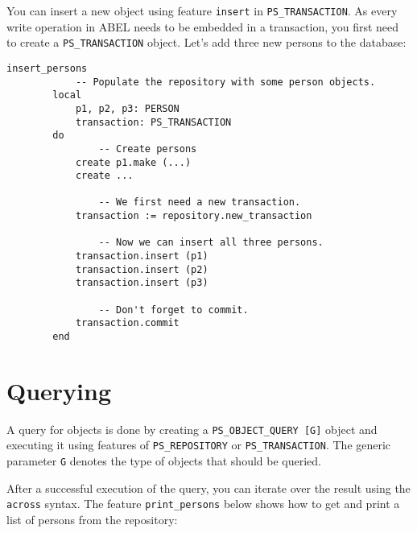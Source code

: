 \documentclass[a4paper,12pt]{report}
\begin{document}
You can insert a new object using feature \lstinline{insert} in \lstinline{PS_TRANSACTION}.
As every write operation in ABEL needs to be embedded in a transaction, you first need to create a \lstinline{PS_TRANSACTION} object.
Let's add three new persons to the database:
\begin{lstlisting}[language=OOSC2Eiffel, captionpos=b, caption={Insertion code.}, label={lst:tutorial_insert}]
	insert_persons
			-- Populate the repository with some person objects.
		local
			p1, p2, p3: PERSON
			transaction: PS_TRANSACTION
		do
				-- Create persons
			create p1.make (...)
			create ...

				-- We first need a new transaction.
			transaction := repository.new_transaction

				-- Now we can insert all three persons.
			transaction.insert (p1)
			transaction.insert (p2)
			transaction.insert (p3)

				-- Don't forget to commit.
			transaction.commit
		end
\end{lstlisting}

\section{Querying}
\label{section:querying}
A query for objects is done by creating a \lstinline!PS_OBJECT_QUERY [G]! object and executing it using features of \lstinline!PS_REPOSITORY! or \lstinline!PS_TRANSACTION!.
The generic parameter \lstinline!G! denotes the type of objects that should be queried.

After a successful execution of the query, you can iterate over the result using the \lstinline!across! syntax. 
The feature \lstinline{print_persons} below shows how to get and print a list of persons from the repository:
\end{document}
